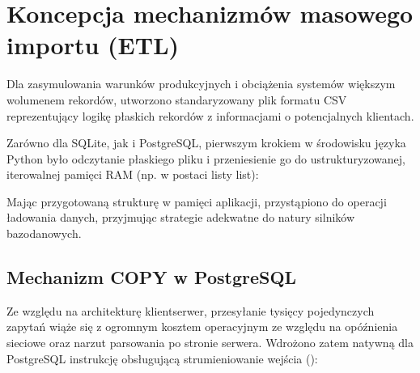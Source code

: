 \documentclass[a4paper,11pt,english,openany,oneside]{sphinxmanual}
\begin{document}
\section{Koncepcja mechanizmów masowego importu (ETL)}
\label{\detokenize{rozdzial_4/index:koncepcja-mechanizmow-masowego-importu-etl}}
\sphinxAtStartPar
Dla zasymulowania warunków produkcyjnych i obciążenia systemów większym wolumenem rekordów, utworzono standaryzowany plik formatu CSV reprezentujący logikę płaskich rekordów z informacjami o potencjalnych klientach.

\sphinxAtStartPar
Zarówno dla SQLite, jak i PostgreSQL, pierwszym krokiem w środowisku języka Python było odczytanie płaskiego pliku i przeniesienie go do ustrukturyzowanej, iterowalnej pamięci RAM (np. w postaci listy list):

\begin{sphinxVerbatim}[commandchars=\\\{\}]
 

     
      
     
      \PYG{p}{[}    \PYG{p}{]}
\end{sphinxVerbatim}

\sphinxAtStartPar
Mając przygotowaną strukturę w pamięci aplikacji, przystąpiono do operacji ładowania danych, przyjmując strategie adekwatne do natury silników bazodanowych.


\subsection{Mechanizm COPY w PostgreSQL}
\label{\detokenize{rozdzial_4/index:mechanizm-copy-w-postgresql}}
\sphinxAtStartPar
Ze względu na architekturę klient\sphinxhyphen{}serwer, przesyłanie tysięcy pojedynczych zapytań  wiąże się z ogromnym kosztem operacyjnym ze względu na opóźnienia sieciowe oraz narzut parsowania po stronie serwera. Wdrożono zatem natywną dla PostgreSQL instrukcję  obsługującą strumieniowanie wejścia ():
\end{document}

